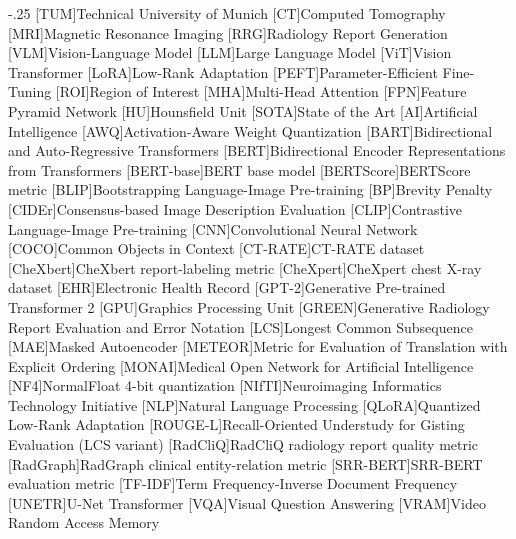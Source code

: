 \documentclass[headsepline,footsepline,footinclude=false,oneside,fontsize=11pt,paper=a4,listof=totoc,bibliography=totoc]{scrbook} %
\begin{document}
\begin{acronym}
	\itemsep-.25\baselineskip
	[TUM]{Technical University of Munich}
	[CT]{Computed Tomography}
	[MRI]{Magnetic Resonance Imaging}
	[RRG]{Radiology Report Generation}
	[VLM]{Vision-Language Model}
	[LLM]{Large Language Model}
	[ViT]{Vision Transformer}
	[LoRA]{Low-Rank Adaptation}
	[PEFT]{Parameter-Efficient Fine-Tuning}
	[ROI]{Region of Interest}
	[MHA]{Multi-Head Attention}
	[FPN]{Feature Pyramid Network}
	[HU]{Hounsfield Unit}
	[SOTA]{State of the Art}
	[AI]{Artificial Intelligence}
	[AWQ]{Activation-Aware Weight Quantization}
	[BART]{Bidirectional and Auto-Regressive Transformers}
	[BERT]{Bidirectional Encoder Representations from Transformers}
	[BERT-base]{BERT base model}
	[BERTScore]{BERTScore metric}
	[BLIP]{Bootstrapping Language-Image Pre-training}
	[BP]{Brevity Penalty}
	[CIDEr]{Consensus-based Image Description Evaluation}
	[CLIP]{Contrastive Language-Image Pre-training}
	[CNN]{Convolutional Neural Network}
	[COCO]{Common Objects in Context}
	[CT-RATE]{CT-RATE dataset}
	[CheXbert]{CheXbert report-labeling metric}
	[CheXpert]{CheXpert chest X-ray dataset}
	[EHR]{Electronic Health Record}
	[GPT-2]{Generative Pre-trained Transformer 2}
	[GPU]{Graphics Processing Unit}
	[GREEN]{Generative Radiology Report Evaluation and Error Notation}
	[LCS]{Longest Common Subsequence}
	[MAE]{Masked Autoencoder}
	[METEOR]{Metric for Evaluation of Translation with Explicit Ordering}
	[MONAI]{Medical Open Network for Artificial Intelligence}
	[NF4]{NormalFloat 4-bit quantization}
	[NIfTI]{Neuroimaging Informatics Technology Initiative}
	[NLP]{Natural Language Processing}
	[QLoRA]{Quantized Low-Rank Adaptation}
	[ROUGE-L]{Recall-Oriented Understudy for Gisting Evaluation (LCS variant)}
	[RadCliQ]{RadCliQ radiology report quality metric}
	[RadGraph]{RadGraph clinical entity-relation metric}
	[SRR-BERT]{SRR-BERT evaluation metric}
	[TF-IDF]{Term Frequency-Inverse Document Frequency}
	[UNETR]{U-Net Transformer}
	[VQA]{Visual Question Answering}
	[VRAM]{Video Random Access Memory}
\end{acronym}

\listoffigures{}
\listoftables{}
\printbibliography{}

\appendix{}


\end{document}
